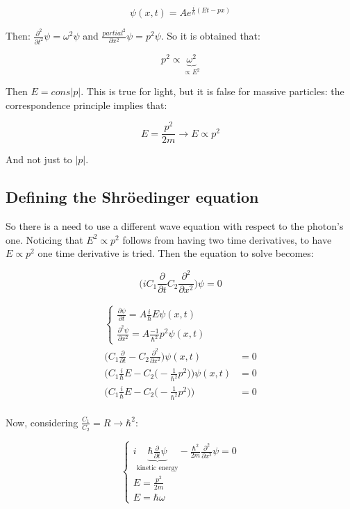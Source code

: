   $$\psi(x,t) = Ae^{\frac{i}{\hbar}(Et -px)}$$


  Then: $\frac{\partial^2{}}{\partial{t^2}}\psi = \omega^2\psi$ and $\frac{partial^2}{\partial x^2}\psi = p^2\psi$.
  So it is obtained that:

  $${p^2}\propto\underbrace{\omega^2}_{\propto E^2}$$

  Then $E = cons|p|$.
  This is true for light, but it is false for massive particles: the correspondence principle implies that:

  $$E = \frac{p^2}{2m}\rightarrow E\propto p^2$$

  And not just to $|p|$.

  \subsection{Defining the Shr\"oedinger equation}
  So there is a need to use a different wave equation with respect to the photon's one.
  Noticing that $E^2\propto p^2$ follows from having two time derivatives, to have $E\propto p^2$ one time derivative is tried.
  Then the equation to solve becomes:

  $$\biggl(iC_1\frac{\partial}{\partial t} C_2\frac{\partial^2}{\partial x^2}\biggr)\psi = 0$$

  \begin{align*}
    \begin{cases}\frac{\partial\psi}{\partial t} = A\frac{i}{\hbar}E\psi(x,t)\\\frac{\partial^2\psi}{\partial x^2} = A\frac{-1}{\hbar^2}p^2\psi(x,t)\end{cases}\\
    \biggl(C_1\frac{\partial}{\partial t} - C_2\frac{\partial^2}{\partial x^2}\biggr)\psi(x,t) &=0\\
    \biggl(C_1\frac{i}{\hbar}E-C_2\bigl(-\frac{1}{\hbar^2}p^2\bigr)\biggr)\psi(x,t) &= 0\\
    \biggl(C_1\frac{i}{\hbar}E-C_2\bigl(-\frac{1}{\hbar^2}p^2\bigr)\biggr) &= 0\\
  \end{align*}

  Now, considering $\frac{C_1}{C_2}=R\rightarrow \hbar^2$:

  $$\begin{cases} i\underbrace{\hbar\frac{\partial}{\partial t}\psi}_{\text{kinetic energy}}-\frac{\hbar^2}{2m}\frac{\partial^2}{\partial x^2}\psi = 0\\E =\frac{p^2}{2m}\\E = \hbar\omega\end{cases}$$

